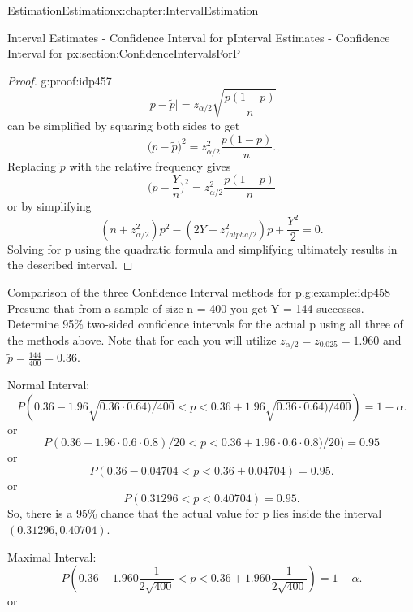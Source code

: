 \documentclass[oneside,10pt,]{book}
\numberwithin{equation}{section}
\newcommand{\lt}{<}
\begin{document}
\begin{chapterptx}{Estimation}{}{Estimation}{}{}{x:chapter:IntervalEstimation}
\begin{sectionptx}{Interval Estimates - Confidence Interval for p}{}{Interval Estimates - Confidence Interval for p}{}{}{x:section:ConfidenceIntervalsForP}
\begin{proof}{}{g:proof:idp457}
\begin{equation*}
\big | p - \tilde{p} \big | = z_{\alpha /2} \sqrt{\frac{p(1-p)}{n}}
\end{equation*}
can be simplified by squaring both sides to get%
\begin{equation*}
\big ( p - \tilde{p} \big )^2 = z_{\alpha /2}^2 \frac{p(1-p)}{n}.
\end{equation*}
Replacing \(\tilde{p}\) with the relative frequency gives%
\begin{equation*}
\big ( p - \frac{Y}{n} \big )^2 = z_{\alpha /2}^2 \frac{p(1-p)}{n}
\end{equation*}
or by simplifying%
\begin{equation*}
(n+z_{\alpha /2}^2 )p^2 - (2Y+z_{/alpha /2}^2) p + \frac{Y^2}{2} = 0.
\end{equation*}
Solving for p using the quadratic formula and simplifying ultimately results in the described interval.%
\end{proof}
\begin{example}{Comparison of the three Confidence Interval methods for p.}{g:example:idp458}%
Presume that from a sample of size n = 400 you get Y = 144 successes.  Determine 95\% two-sided confidence intervals for the actual p using all three of the methods above. Note that for each you will utilize \(z_{\alpha/2} = z_{0.025} = 1.960\) and \(\tilde{p} = \frac{144}{400} = 0.36\).%
\par
Normal Interval:%
\begin{equation*}
P( 0.36 - 1.96 \sqrt{0.36 \cdot 0.64) / 400} \lt  p \lt 0.36 + 1.96 \sqrt{0.36 \cdot 0.64) / 400}) = 1 - \alpha.
\end{equation*}
or%
\begin{equation*}
P( 0.36 - 1.96 \cdot 0.6 \cdot 0.8) / 20 \lt  p \lt 0.36 + 1.96 \cdot 0.6 \cdot 0.8) / 20) = 0.95 
\end{equation*}
or%
\begin{equation*}
P( 0.36 - 0.04704 \lt  p \lt 0.36 + 0.04704) = 0.95 .
\end{equation*}
or%
\begin{equation*}
P( 0.31296 \lt  p \lt 0.40704) = 0.95 .
\end{equation*}
So, there is a 95\% chance that the actual value for p lies inside the interval \((0.31296 , 0.40704).\)%
\par
Maximal Interval:%
\begin{equation*}
P( 0.36 - 1.960 \frac{1}{2\sqrt{400}} \lt  p \lt 0.36 + 1.960 \frac{1}{2\sqrt{400}} ) = 1 - \alpha.
\end{equation*}
or%

\end{example}
\end{sectionptx}
\end{chapterptx}
\end{document}
